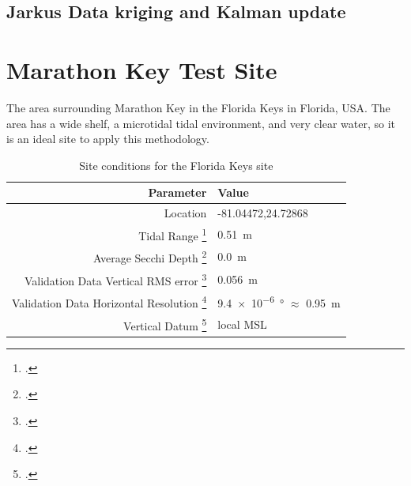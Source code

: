 \subsection{Jarkus Data kriging and Kalman update}



\section{Marathon Key Test Site}
The area surrounding Marathon Key in the Florida Keys in Florida, USA. The area has a wide shelf, a microtidal tidal environment, and very clear water, so it is an ideal site to apply this methodology. 

\begin{table}[h]
    \begin{minipage}{0.5\textwidth}
        \centering\begin{tabular}{r l }
            Parameter                                                      & \textbf{Value}                                 \\
            \hline
            Location                                                       & -81.04472,24.72868                             \\
            Tidal Range \footcite{Tidal_data_reanalysis2022}               & \qty{0.51}{m}                                  \\
            Average Secchi Depth \footcite{ACRI-STGlobColourTeam2020}      & \qty{0.0}{m}                                   \\
            Validation Data Vertical RMS error \footcite{Keys2019Lidar}    & \qty{0.056}{m}                                 \\
            Validation Data Horizontal Resolution \footcite{Keys2019Lidar} & \qty{9.4e-6}{ \degree} $\approx$ \qty{0.95}{m} \\
            Vertical Datum \footcite{Keys2019Lidar}                        & local MSL                                      \\
        \end{tabular}
    \end{minipage}
    \caption{Site conditions for the Florida Keys site}
    \label{table:floridasitestats}
\end{table}


